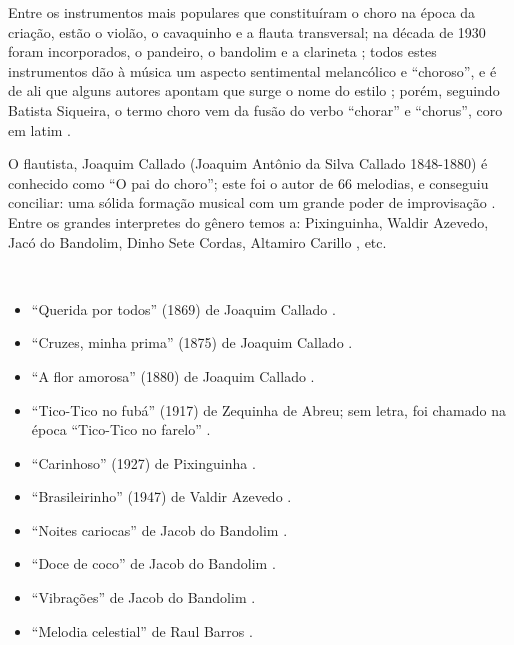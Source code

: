 Entre os instrumentos mais populares que constituíram o choro na época da criação, 
estão o violão, o cavaquinho e a flauta transversal;
na década de 1930 foram incorporados, o pandeiro, o bandolim e a clarineta \cite[pp. 64]{reinato2010musica} \cite[pp. 79]{dourado2004dicionario} \cite[pp. 132]{perna2002samba};
todos estes instrumentos dão à música um aspecto sentimental melancólico e ``choroso'', e
é de ali que alguns autores apontam que surge o nome do estilo \cite[pp. 132]{perna2002samba};
porém, seguindo Batista Siqueira, 
o termo choro vem da fusão do verbo ``chorar'' e ``chorus'', coro em latim \cite[pp. 13]{diniz2003almanaque}.

O flautista, Joaquim Callado (Joaquim Antônio da Silva Callado 1848-1880) 
é conhecido como ``O pai do choro'';
este foi o autor de 66 melodias, e conseguiu conciliar: 
uma sólida formação musical com um grande poder de improvisação  \cite[pp. 15]{diniz2003almanaque} \cite[pp. 64]{reinato2010musica}.
Entre os grandes interpretes do gênero temos a:
Pixinguinha, Waldir Azevedo, Jacó do Bandolim, Dinho Sete Cordas, Altamiro Carillo \cite[pp. 79]{dourado2004dicionario}, etc.

\begin{example} ~

\begin{itemize}
\item ``Querida por todos'' (1869) de Joaquim Callado \cite[pp. 15]{diniz2003almanaque} \cite[pp. 1089]{marcondes1977enciclopediav2}.
\item ``Cruzes, minha prima'' (1875) de Joaquim Callado \cite[pp. 15]{diniz2003almanaque} \cite[pp. 951]{marcondes1977enciclopediav2}.
\item ``A flor amorosa'' (1880) de Joaquim Callado \cite[pp. 8]{livingston2005choro} \cite[pp. 15]{diniz2003almanaque}  \cite[pp. 985]{marcondes1977enciclopediav2}.
\item ``Tico-Tico no fubá'' (1917) de Zequinha de Abreu; sem letra, foi chamado na época ``Tico-Tico no farelo'' \cite[pp. 6]{marcondes1998enciclopedia} \cite[pp. 39,91]{diniz2003almanaque}.
\item ``Carinhoso'' (1927) de Pixinguinha   \cite[pp. 133]{perna2002samba}.
\item ``Brasileirinho'' (1947) de Valdir Azevedo  \cite[pp. 133]{perna2002samba}.
\item ``Noites cariocas'' de Jacob do Bandolim \cite{diniz2003almanaque}.
\item ``Doce de coco'' de Jacob do Bandolim \cite{diniz2003almanaque}.
\item ``Vibrações'' de Jacob do Bandolim \cite{diniz2003almanaque}.
\item ``Melodia celestial'' de Raul Barros \cite[pp. 130]{livingston2005choro}.
\end{itemize}
\end{example}

